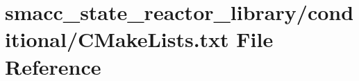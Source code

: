 \hypertarget{state__reactor__library_2conditional_2CMakeLists_8txt}{}\section{smacc\+\_\+state\+\_\+reactor\+\_\+library/conditional/\+C\+Make\+Lists.txt File Reference}
\label{state__reactor__library_2conditional_2CMakeLists_8txt}
